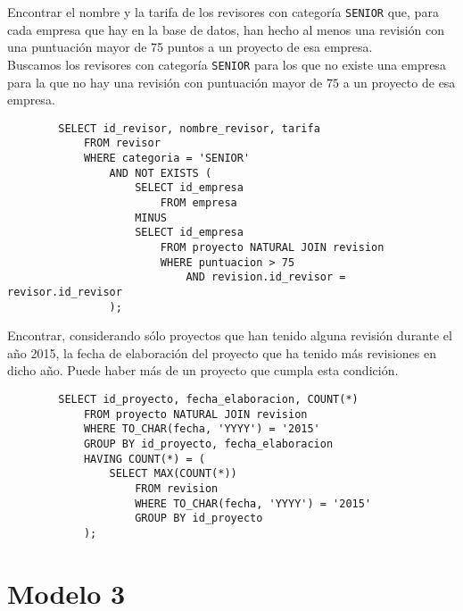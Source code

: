 \documentclass[12pt]{article}
\begin{document}
\begin{ejercicio}[SQL]
    Encontrar el nombre y la tarifa de los revisores con categoría \verb|SENIOR| que, para cada empresa que hay en la base de datos, han hecho al menos una revisión con una puntuación mayor de 75 puntos a un proyecto de esa empresa.\\

    Buscamos los revisores con categoría \verb|SENIOR| para los que no existe una empresa para la que no hay una revisión con puntuación mayor de $75$ a un proyecto de esa empresa.
    \begin{verbatim}
        SELECT id_revisor, nombre_revisor, tarifa
            FROM revisor
            WHERE categoria = 'SENIOR'
                AND NOT EXISTS (
                    SELECT id_empresa
                        FROM empresa
                    MINUS
                    SELECT id_empresa
                        FROM proyecto NATURAL JOIN revision
                        WHERE puntuacion > 75
                            AND revision.id_revisor = revisor.id_revisor
                );
    \end{verbatim}
\end{ejercicio}

\begin{ejercicio}[SQL]
    Encontrar, considerando sólo proyectos que han tenido alguna revisión durante el año 2015, la fecha de elaboración del proyecto que ha tenido más revisiones en dicho año. Puede haber más de un proyecto que cumpla esta condición.
    \begin{verbatim}
        SELECT id_proyecto, fecha_elaboracion, COUNT(*)
            FROM proyecto NATURAL JOIN revision
            WHERE TO_CHAR(fecha, 'YYYY') = '2015'
            GROUP BY id_proyecto, fecha_elaboracion
            HAVING COUNT(*) = (
                SELECT MAX(COUNT(*))
                    FROM revision
                    WHERE TO_CHAR(fecha, 'YYYY') = '2015'
                    GROUP BY id_proyecto
            );
    \end{verbatim}
\end{ejercicio}

\newpage
\section{Modelo 3}\label{sec:modelo3}
\end{document}
